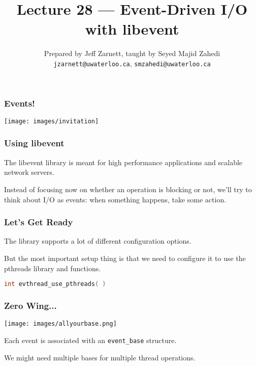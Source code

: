 

\title{Lecture 28 --- Event-Driven I/O with libevent }

\author{Prepared by Jeff Zarnett, taught by Seyed Majid Zahedi \\ \small \texttt{jzarnett@uwaterloo.ca}, \texttt{smzahedi@uwaterloo.ca}}

\date{}




\begin{frame}
	\titlepage

\end{frame}



\begin{frame}
	\frametitle{Events!}

	\begin{center}
		\texttt{[image: images/invitation]}
	\end{center}


\end{frame}


\begin{frame}
	\frametitle{Using libevent}

	The libevent library is meant for high performance applications and scalable network servers.

	Instead of focusing now on whether an operation is blocking or not, we'll try to think about I/O as events: when something happens, take some action.

\end{frame}


\begin{frame}[fragile]
	\frametitle{Let's Get Ready}
	The library supports a lot of different configuration options.

	But the most important setup thing is that we need to configure it to use the pthreads library and functions.

	\begin{lstlisting}[language=C]
int evthread_use_pthreads( )
\end{lstlisting}

\end{frame}


\begin{frame}
	\frametitle{Zero Wing...}

	\begin{center}
		\texttt{[image: images/allyourbase.png]}
	\end{center}

	Each event is associated with an \texttt{event\_base} structure.

	We might need multiple bases for multiple thread operations.

\end{frame}

